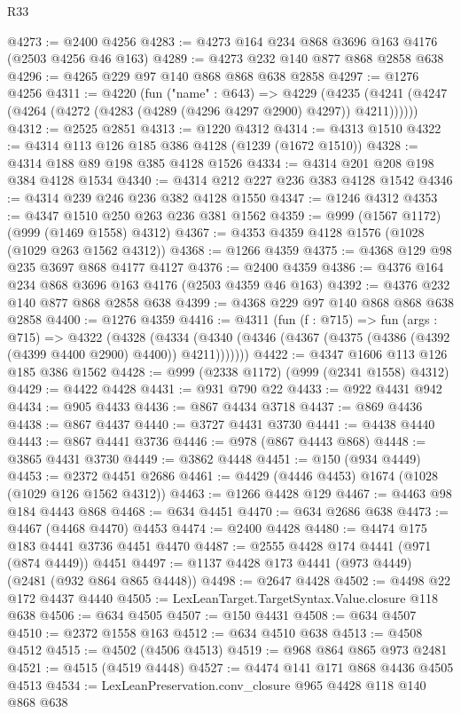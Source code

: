 \begin{lexlean}{R33}
\begin{coremodule}
@4273 := @2400 @4256
@4283 := @4273 @164 @234 @868 @3696 @163 @4176 (@2503 @4256 @46 @163)
@4289 := @4273 @232 @140 @877 @868 @2858 @638
@4296 := @4265 @229 @97 @140 @868 @868 @638 @2858
@4297 := @1276 @4256
@4311 := @4220
    (fun ("name" : @643) =>
    @4229 (@4235 (@4241 (@4247 (@4264 (@4272 (@4283 (@4289 (@4296 @4297 @2900) @4297)) @4211))))))
@4312 := @2525 @2851
@4313 := @1220 @4312
@4314 := @4313 @1510
@4322 := @4314 @113 @126 @185 @386 @4128 (@1239 (@1672 @1510))
@4328 := @4314 @188 @89 @198 @385 @4128 @1526
@4334 := @4314 @201 @208 @198 @384 @4128 @1534
@4340 := @4314 @212 @227 @236 @383 @4128 @1542
@4346 := @4314 @239 @246 @236 @382 @4128 @1550
@4347 := @1246 @4312
@4353 := @4347 @1510 @250 @263 @236 @381 @1562
@4359 := @999 (@1567 @1172) (@999 (@1469 @1558) @4312)
@4367 := @4353 @4359 @4128 @1576 (@1028 (@1029 @263 @1562 @4312))
@4368 := @1266 @4359
@4375 := @4368 @129 @98 @235 @3697 @868 @4177 @4127
@4376 := @2400 @4359
@4386 := @4376 @164 @234 @868 @3696 @163 @4176 (@2503 @4359 @46 @163)
@4392 := @4376 @232 @140 @877 @868 @2858 @638
@4399 := @4368 @229 @97 @140 @868 @868 @638 @2858
@4400 := @1276 @4359
@4416 := @4311
    (fun (f : @715) =>
    fun (args : @715) =>
    @4322
      (@4328
        (@4334 (@4340 (@4346 (@4367 (@4375 (@4386 (@4392 (@4399 @4400 @2900) @4400)) @4211)))))))
@4422 := @4347 @1606 @113 @126 @185 @386 @1562
@4428 := @999 (@2338 @1172) (@999 (@2341 @1558) @4312)
@4429 := @4422 @4428
@4431 := @931 @790 @22
@4433 := @922 @4431 @942
@4434 := @905 @4433
@4436 := @867 @4434 @3718
@4437 := @869 @4436
@4438 := @867 @4437
@4440 := @3727 @4431 @3730
@4441 := @4438 @4440
@4443 := @867 @4441 @3736
@4446 := @978 (@867 @4443 @868)
@4448 := @3865 @4431 @3730
@4449 := @3862 @4448
@4451 := @150 (@934 @4449)
@4453 := @2372 @4451 @2686
@4461 := @4429 (@4446 @4453) @1674 (@1028 (@1029 @126 @1562 @4312))
@4463 := @1266 @4428 @129
@4467 := @4463 @98 @184 @4443 @868
@4468 := @634 @4451
@4470 := @634 @2686 @638
@4473 := @4467 (@4468 @4470) @4453
@4474 := @2400 @4428
@4480 := @4474 @175 @183 @4441 @3736 @4451 @4470
@4487 := @2555 @4428 @174 @4441 (@971 (@874 @4449)) @4451
@4497 := @1137 @4428 @173 @4441 (@973 @4449) (@2481 (@932 @864 @865 @4448))
@4498 := @2647 @4428
@4502 := @4498 @22 @172 @4437 @4440
@4505 := LexLeanTarget.TargetSyntax.Value.closure @118 @638
@4506 := @634 @4505
@4507 := @150 @4431
@4508 := @634 @4507
@4510 := @2372 @1558 @163
@4512 := @634 @4510 @638
@4513 := @4508 @4512
@4515 := @4502 (@4506 @4513)
@4519 := @968 @864 @865 @973 @2481
@4521 := @4515 (@4519 @4448)
@4527 := @4474 @141 @171 @868 @4436 @4505 @4513
@4534 := LexLeanPreservation.conv_closure @965 @4428 @118 @140 @868 @638

\end{coremodule}
\end{lexlean}
